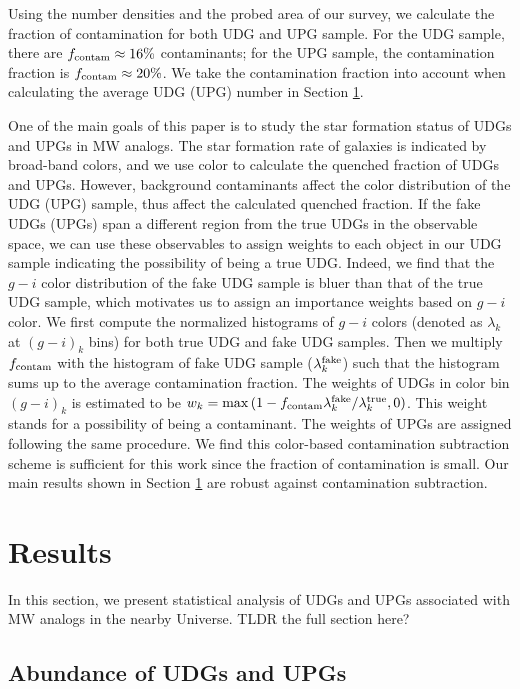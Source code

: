 \documentclass[twocolumn,astrosymb,twocolappendix]{aastex631}
\begin{document}
\begin{CJK*}{UTF8}{gbsn}
Using the number densities and the probed area of our survey, we calculate the fraction of contamination for both UDG and UPG sample. For the UDG sample, there are $f_{\rm contam} \approx 16\%$ contaminants; for the UPG sample, the contamination fraction is $f_{\rm contam} \approx 20\%$. We take the contamination fraction into account when calculating the average UDG (UPG) number in Section \ref{sec:results}. 

One of the main goals of this paper is to study the star formation status of UDGs and UPGs in MW analogs. The star formation rate of galaxies is indicated by broad-band colors, and we use color to calculate the quenched fraction of UDGs and UPGs. However, background contaminants affect the color distribution of the UDG (UPG) sample, thus affect the calculated quenched fraction. If the fake UDGs (UPGs) span a different region from the true UDGs in the observable space, we can use these observables to assign weights to each object in our UDG sample indicating the possibility of being a true UDG. Indeed, we find that the $g-i$ color distribution of the fake UDG sample is bluer than that of the true UDG sample, which motivates us to assign an importance weights based on $g-i$ color. We first compute the normalized histograms of $g-i$ colors (denoted as $\lambda_k$ at $(g-i)_{k}$ bins) for both true UDG and fake UDG samples. Then we multiply $f_{\rm contam}$ with the histogram of fake UDG sample ($\lambda_k^{\rm fake}$) such that the histogram sums up to the average contamination fraction. The weights of UDGs in color bin $(g-i)_k$ is estimated to be $w_k = \max\,(1 - f_{\rm contam} \lambda_k^{\rm fake} / \lambda_k^{\rm true}, 0)$. This weight stands for a possibility of being a contaminant. The weights of UPGs are assigned following the same procedure. We find this color-based contamination subtraction scheme is sufficient for this work since the fraction of contamination is small. Our main results shown in Section \ref{sec:results} are robust against contamination subtraction. 


\section{Results}\label{sec:results}
In this section, we present statistical analysis of UDGs and UPGs associated with MW analogs in the nearby Universe. TLDR the full section here?

\subsection{Abundance of UDGs and UPGs}\label{sec:n_udg}


\end{CJK*}
\end{document}
